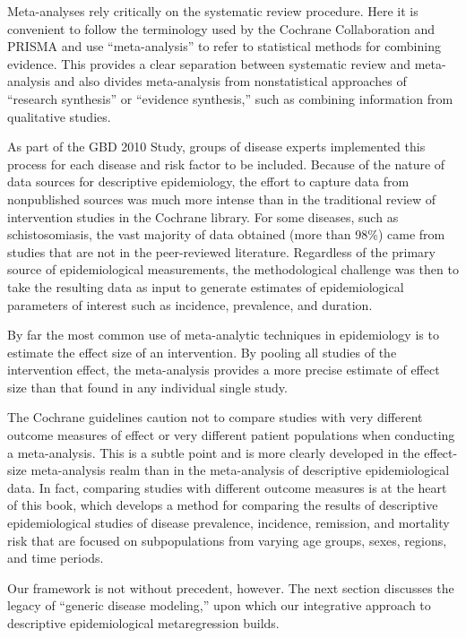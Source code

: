 Meta-analyses rely critically on the systematic review procedure. Here
it is convenient to follow the terminology used by the Cochrane
Collaboration and PRISMA and use ``meta-analysis'' to refer to
statistical methods for combining evidence.  This provides a clear
separation between systematic review and meta-analysis and also divides
meta-analysis from nonstatistical approaches of ``research
synthesis'' or ``evidence synthesis,'' such as combining information
from qualitative studies.

As part of the GBD 2010 Study, groups of disease experts implemented
this process for each disease and risk factor to be
included. Because of the nature of data sources for descriptive
epidemiology, the effort to capture data from nonpublished sources
was much more intense than in the traditional review of
intervention studies in the Cochrane library.  For some diseases, such
as schistosomiasis, the vast majority of data obtained (more than
98\%) came from studies that are not in the peer-reviewed literature.
Regardless of the primary source of epidemiological measurements, the
methodological challenge was then to take the resulting data as input
to generate estimates of epidemiological parameters of interest such
as incidence, prevalence, and duration.

By far the most common use of meta-analytic techniques in epidemiology is to estimate
the effect size of an intervention.  By pooling all studies of the
intervention effect, the meta-analysis provides a more precise
estimate of effect size than that found in any individual single
study.

The Cochrane guidelines caution not to compare studies with very
different outcome measures of effect or very different patient
populations when conducting a
meta-analysis.\cite{_cochrane_2012} This is a subtle point
and is more clearly developed in the effect-size meta-analysis realm
than in the meta-analysis of descriptive epidemiological data.  In
fact, comparing studies with different outcome measures is at the
heart of this book, which develops a method for comparing the results
of descriptive epidemiological studies of disease prevalence,
incidence, remission, and mortality risk that are focused on
subpopulations from varying age groups, sexes, regions, and time
periods.

Our framework is not without precedent, however.  The next section discusses the
legacy of ``generic disease modeling,'' upon which our integrative approach
to descriptive epidemiological metaregression builds.



